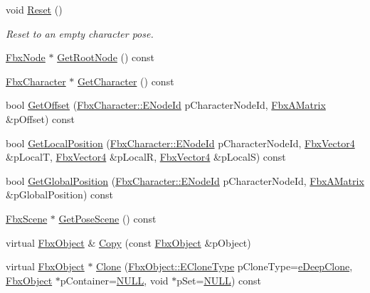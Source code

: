 \begin{DoxyCompactItemize}
\item 
void \hyperlink{class_fbx_character_pose_ab0aa178aa39799fae44ef3837dfcc9bf}{Reset} ()
\begin{DoxyCompactList}\small\item\em Reset to an empty character pose. \end{DoxyCompactList}\item 
\hyperlink{class_fbx_node}{Fbx\+Node} $\ast$ \hyperlink{class_fbx_character_pose_a7dd8f39dcef2c74844a3d367a67a681b}{Get\+Root\+Node} () const
\item 
\hyperlink{class_fbx_character}{Fbx\+Character} $\ast$ \hyperlink{class_fbx_character_pose_ac0429f7f15902a3eeb0c50e890529cde}{Get\+Character} () const
\item 
bool \hyperlink{class_fbx_character_pose_a0abc45efdccf78de0b736232bb85e106}{Get\+Offset} (\hyperlink{class_fbx_character_ad75bf42026e435ac0ff4d7ece2317be4}{Fbx\+Character\+::\+E\+Node\+Id} p\+Character\+Node\+Id, \hyperlink{class_fbx_a_matrix}{Fbx\+A\+Matrix} \&p\+Offset) const
\item 
bool \hyperlink{class_fbx_character_pose_ab258febbc8198b6687eaef43654909c5}{Get\+Local\+Position} (\hyperlink{class_fbx_character_ad75bf42026e435ac0ff4d7ece2317be4}{Fbx\+Character\+::\+E\+Node\+Id} p\+Character\+Node\+Id, \hyperlink{class_fbx_vector4}{Fbx\+Vector4} \&p\+LocalT, \hyperlink{class_fbx_vector4}{Fbx\+Vector4} \&p\+LocalR, \hyperlink{class_fbx_vector4}{Fbx\+Vector4} \&p\+LocalS) const
\item 
bool \hyperlink{class_fbx_character_pose_abe05a6239a8a3e436a3e4d28ccde5499}{Get\+Global\+Position} (\hyperlink{class_fbx_character_ad75bf42026e435ac0ff4d7ece2317be4}{Fbx\+Character\+::\+E\+Node\+Id} p\+Character\+Node\+Id, \hyperlink{class_fbx_a_matrix}{Fbx\+A\+Matrix} \&p\+Global\+Position) const
\item 
\hyperlink{class_fbx_scene}{Fbx\+Scene} $\ast$ \hyperlink{class_fbx_character_pose_a7176bff4eda08a17158ec2f0850eb39a}{Get\+Pose\+Scene} () const
\item 
virtual \hyperlink{class_fbx_object}{Fbx\+Object} \& \hyperlink{class_fbx_character_pose_a7d4ac33deebb7bbfef01f3b6ba3b3cff}{Copy} (const \hyperlink{class_fbx_object}{Fbx\+Object} \&p\+Object)
\item 
virtual \hyperlink{class_fbx_object}{Fbx\+Object} $\ast$ \hyperlink{class_fbx_character_pose_af191f8d48c8f11e795adcb92adae35c5}{Clone} (\hyperlink{class_fbx_object_a9f5626b2d2135684d6ea1e6e4ad2acbb}{Fbx\+Object\+::\+E\+Clone\+Type} p\+Clone\+Type=\hyperlink{class_fbx_object_a9f5626b2d2135684d6ea1e6e4ad2acbbaacdf137ca059c572798287e98c4236d0}{e\+Deep\+Clone}, \hyperlink{class_fbx_object}{Fbx\+Object} $\ast$p\+Container=\hyperlink{fbxarch_8h_a070d2ce7b6bb7e5c05602aa8c308d0c4}{N\+U\+LL}, void $\ast$p\+Set=\hyperlink{fbxarch_8h_a070d2ce7b6bb7e5c05602aa8c308d0c4}{N\+U\+LL}) const

\end{DoxyCompactItemize}

